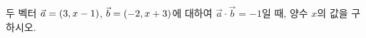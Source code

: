 두 벡터 $\vec{a}=(3{,}\mkern3mu\mathopen{}x-1)$, $\vec{b}=(-2{,}\mkern3mu\mathopen{}x+3)$에 대하여 $\vec{a}\cdot\vec{b}=-1$일 때, 양수 $x$의 값을 구하시오.

